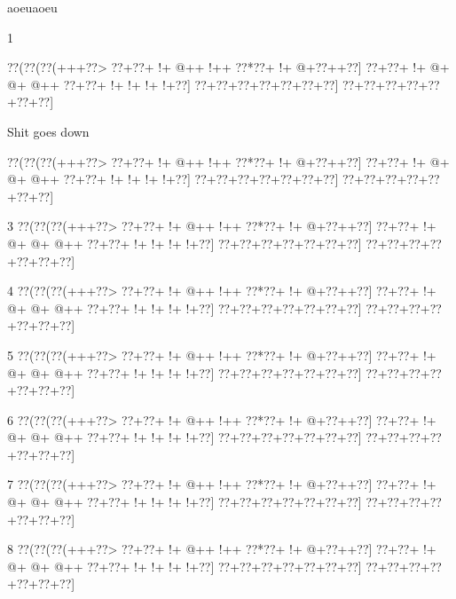 \documentclass{article}
\begin{document}
aoeuaoeu

1

\begin{center}
{\goo
\0??(\0??(\0??(+++\0??>
\0??+\0??+\- !+\- @++\- !++
\0??*\0??+\- !+\- @+\0??++\0??]
\0??+\0??+\- !+\- @+\- @+\- @++
\0??+\0??+\- !+\- !+\- !+\- !+\0??]
\0??+\0??+\0??+\0??+\0??+\0??+\0??]
\0??+\0??+\0??+\0??+\0??+\0??+\0??]}
\end{center}

\begin{center} Shit goes down \end{center}
{\goe
\0??(\0??(\0??(+++\0??>
\0??+\0??+\- !+\- @++\- !++
\0??*\0??+\- !+\- @+\0??++\0??]
\0??+\0??+\- !+\- @+\- @+\- @++
\0??+\0??+\- !+\- !+\- !+\- !+\0??]
\0??+\0??+\0??+\0??+\0??+\0??+\0??]
\0??+\0??+\0??+\0??+\0??+\0??+\0??]}

3
\bgoo
\0??(\0??(\0??(+++\0??>
\0??+\0??+\- !+\- @++\- !++
\0??*\0??+\- !+\- @+\0??++\0??]
\0??+\0??+\- !+\- @+\- @+\- @++
\0??+\0??+\- !+\- !+\- !+\- !+\0??]
\0??+\0??+\0??+\0??+\0??+\0??+\0??]
\0??+\0??+\0??+\0??+\0??+\0??+\0??]

4
\bgoe
\0??(\0??(\0??(+++\0??>
\0??+\0??+\- !+\- @++\- !++
\0??*\0??+\- !+\- @+\0??++\0??]
\0??+\0??+\- !+\- @+\- @+\- @++
\0??+\0??+\- !+\- !+\- !+\- !+\0??]
\0??+\0??+\0??+\0??+\0??+\0??+\0??]
\0??+\0??+\0??+\0??+\0??+\0??+\0??]

5
\bgoe
\0??(\0??(\0??(+++\0??>
\0??+\0??+\- !+\- @++\- !++
\0??*\0??+\- !+\- @+\0??++\0??]
\0??+\0??+\- !+\- @+\- @+\- @++
\0??+\0??+\- !+\- !+\- !+\- !+\0??]
\0??+\0??+\0??+\0??+\0??+\0??+\0??]
\0??+\0??+\0??+\0??+\0??+\0??+\0??]

6
\bgoe
\0??(\0??(\0??(+++\0??>
\0??+\0??+\- !+\- @++\- !++
\0??*\0??+\- !+\- @+\0??++\0??]
\0??+\0??+\- !+\- @+\- @+\- @++
\0??+\0??+\- !+\- !+\- !+\- !+\0??]
\0??+\0??+\0??+\0??+\0??+\0??+\0??]
\0??+\0??+\0??+\0??+\0??+\0??+\0??]

7
\bgoe
\0??(\0??(\0??(+++\0??>
\0??+\0??+\- !+\- @++\- !++
\0??*\0??+\- !+\- @+\0??++\0??]
\0??+\0??+\- !+\- @+\- @+\- @++
\0??+\0??+\- !+\- !+\- !+\- !+\0??]
\0??+\0??+\0??+\0??+\0??+\0??+\0??]
\0??+\0??+\0??+\0??+\0??+\0??+\0??]

8
\bgoe
\0??(\0??(\0??(+++\0??>
\0??+\0??+\- !+\- @++\- !++
\0??*\0??+\- !+\- @+\0??++\0??]
\0??+\0??+\- !+\- @+\- @+\- @++
\0??+\0??+\- !+\- !+\- !+\- !+\0??]
\0??+\0??+\0??+\0??+\0??+\0??+\0??]
\0??+\0??+\0??+\0??+\0??+\0??+\0??]
\end{document}
